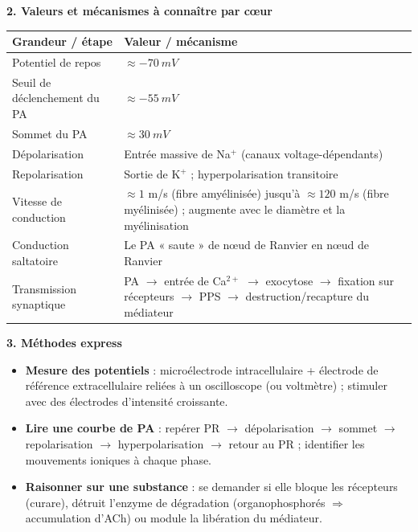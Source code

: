\documentclass[11pt]{article}
\begin{document}
\begin{bilan}
\textbf{2. Valeurs et mécanismes à connaître par cœur}
\begin{center}
\begin{tabularx}{\linewidth}{|l|X|}
\hline
\rowcolor{popblueL} \textbf{Grandeur / étape} & \textbf{Valeur / mécanisme} \\
\hline
Potentiel de repos & $\approx \SI{-70}{mV}$ \\
\hline
Seuil de déclenchement du PA & $\approx \SI{-55}{mV}$ \\
\hline
Sommet du PA & $\approx \SI{+30}{mV}$ \\
\hline
Dépolarisation & Entrée massive de Na$^+$ (canaux voltage-dépendants) \\
\hline
Repolarisation & Sortie de K$^+$ ; hyperpolarisation transitoire \\
\hline
Vitesse de conduction & $\approx 1$ m/s (fibre amyélinisée) jusqu'à $\approx 120$ m/s (fibre myélinisée) ; augmente avec le diamètre et la myélinisation \\
\hline
Conduction saltatoire & Le PA « saute » de nœud de Ranvier en nœud de Ranvier \\
\hline
Transmission synaptique & PA $\rightarrow$ entrée de Ca$^{2+}$ $\rightarrow$ exocytose $\rightarrow$ fixation sur récepteurs $\rightarrow$ PPS $\rightarrow$ destruction/recapture du médiateur \\
\hline
\end{tabularx}
\end{center}

\textbf{3. Méthodes express}
\begin{itemize}
  \item \textbf{Mesure des potentiels} : microélectrode intracellulaire + électrode de référence extracellulaire reliées à un oscilloscope (ou voltmètre) ; stimuler avec des électrodes d'intensité croissante.
  \item \textbf{Lire une courbe de PA} : repérer PR $\rightarrow$ dépolarisation $\rightarrow$ sommet $\rightarrow$ repolarisation $\rightarrow$ hyperpolarisation $\rightarrow$ retour au PR ; identifier les mouvements ioniques à chaque phase.
  \item \textbf{Raisonner sur une substance} : se demander si elle bloque les récepteurs (curare), détruit l'enzyme de dégradation (organophosphorés $\Rightarrow$ accumulation d'ACh) ou module la libération du médiateur.
\end{itemize}
\end{bilan}
\end{document}
